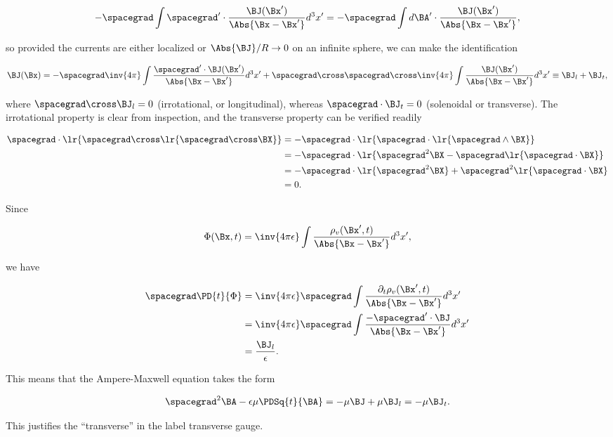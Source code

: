 \begin{dmath}\label{eqn:transverseGauge:320}
-\spacegrad 
\int \spacegrad' \cdot \frac{\BJ(\Bx')}{\Abs{\Bx - \Bx'}} d^3 x'
=
-\spacegrad 
\int d\BA' \cdot \frac{\BJ(\Bx')}{\Abs{\Bx - \Bx'}},
\end{dmath}

so provided the currents are either localized or \( \Abs{\BJ}/R \rightarrow 0 \) on an infinite sphere, we can make the identification

\begin{equation}\label{eqn:transverseGauge:340}
\BJ(\Bx) 
=
-\spacegrad \inv{4 \pi} \int \frac{\spacegrad' \cdot \BJ(\Bx')}{\Abs{\Bx - \Bx'}} d^3 x'
+
\spacegrad \cross \spacegrad \cross \inv{4 \pi} \int \frac{\BJ(\Bx')}{\Abs{\Bx - \Bx'}} d^3 x'
\equiv
\BJ_l + 
\BJ_t,
\end{equation}

where \( \spacegrad \cross \BJ_l = 0 \) (irrotational, or longitudinal), whereas \( \spacegrad \cdot \BJ_t = 0 \) (solenoidal or transverse).  The irrotational property is clear from inspection, and the transverse property can be verified readily

\begin{dmath}\label{eqn:transverseGauge:360}
\begin{aligned}
\spacegrad \cdot \lr{ \spacegrad \cross \lr{ \spacegrad \cross \BX } }
&=
-\spacegrad \cdot \lr{ \spacegrad \cdot \lr{ \spacegrad \wedge \BX } } \\
&=
-\spacegrad \cdot \lr{ \spacegrad^2 \BX - \spacegrad \lr{ \spacegrad \cdot \BX } } \\
&=
-\spacegrad \cdot \lr{\spacegrad^2 \BX} + \spacegrad^2 \lr{ \spacegrad \cdot \BX } \\
&= 0.
\end{aligned}
\end{dmath}

Since

\begin{dmath}\label{eqn:transverseGauge:380}
\Phi(\Bx, t) 
=
\inv{4 \pi \epsilon} \int \frac{\rho_v(\Bx', t)}{\Abs{\Bx - \Bx'}} d^3 x',
\end{dmath}

we have

\begin{dmath}\label{eqn:transverseGauge:400}
\begin{aligned}
\spacegrad \PD{t}{\Phi}
&=
\inv{4 \pi \epsilon} \spacegrad \int \frac{\partial_t \rho_v(\Bx', t)}{\Abs{\Bx - \Bx'}} d^3 x' \\
&=
\inv{4 \pi \epsilon} \spacegrad \int \frac{-\spacegrad' \cdot \BJ}{\Abs{\Bx - \Bx'}} d^3 x' \\
&=
\frac{\BJ_l}{\epsilon}.
\end{aligned}
\end{dmath}

This means that the Ampere-Maxwell equation takes the form

\begin{equation}\label{eqn:transverseGauge:420}
\spacegrad^2 \BA - \epsilon \mu \PDSq{t}{\BA} 
= -\mu \BJ + \mu \BJ_l
= -\mu \BJ_t.
\end{equation}

This justifies the ``transverse'' in the label transverse gauge.

\EndArticle
